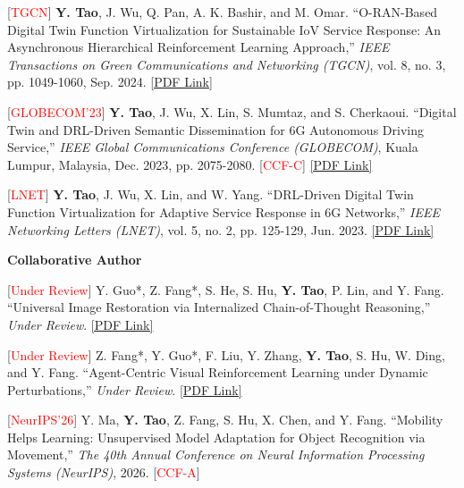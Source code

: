 \documentclass[letterpaper,11pt]{article}
\newcommand{\pdflink}[1]{\href{#1}{[PDF Link]}}
\begin{document}
{{{{{{\begin{justify}
    \normalsize
    [\textcolor{red}{TGCN}] \textbf{Y. Tao}, J. Wu, Q. Pan, A. K. Bashir, and M. Omar. ``O-RAN-Based Digital Twin Function Virtualization for Sustainable IoV Service Response: An Asynchronous Hierarchical Reinforcement Learning Approach,'' \textit{IEEE Transactions on Green Communications and Networking (TGCN)}, vol. 8, no. 3, pp. 1049-1060, Sep. 2024. \pdflink{https://ieeexplore.ieee.org/document/10614333}
\end{justify}

\begin{justify}
    \normalsize
    [\textcolor{red}{GLOBECOM'23}] \textbf{Y. Tao}, J. Wu, X. Lin, S. Mumtaz, and S. Cherkaoui. ``Digital Twin and DRL-Driven Semantic Dissemination for 6G Autonomous Driving Service,'' \textit{IEEE Global Communications Conference (GLOBECOM)}, Kuala Lumpur, Malaysia, Dec. 2023, pp. 2075-2080. [\textcolor{red}{CCF-C}] \pdflink{https://ieeexplore.ieee.org/document/10437455}
\end{justify}

\begin{justify}
    \normalsize
    [\textcolor{red}{LNET}] \textbf{Y. Tao}, J. Wu, X. Lin, and W. Yang. ``DRL-Driven Digital Twin Function Virtualization for Adaptive Service Response in 6G Networks,'' \textit{IEEE Networking Letters (LNET)}, vol. 5, no. 2, pp. 125-129, Jun. 2023. \pdflink{https://ieeexplore.ieee.org/document/10107755}
\end{justify}

\vspace{2mm}
\large\textbf{Collaborative Author}

\begin{justify}
    \normalsize
    [\textcolor{red}{Under Review}] Y. Guo*, Z. Fang*, S. He, S. Hu, \textbf{Y. Tao}, P. Lin, and Y. Fang. ``Universal Image Restoration via Internalized Chain-of-Thought Reasoning,'' \textit{Under Review}. \pdflink{https://arxiv.org/pdf/2606.17557}
\end{justify}

\begin{justify}
    \normalsize
    [\textcolor{red}{Under Review}] Z. Fang*, Y. Guo*, F. Liu, Y. Zhang, \textbf{Y. Tao}, S. Hu, W. Ding, and Y. Fang. ``Agent-Centric Visual Reinforcement Learning under Dynamic Perturbations,'' \textit{Under Review}. \pdflink{https://arxiv.org/pdf/2604.24661}
\end{justify}

\begin{justify}
    \normalsize
    [\textcolor{red}{NeurIPS'26}] Y. Ma, \textbf{Y. Tao}, Z. Fang, S. Hu, X. Chen, and Y. Fang. ``Mobility Helps Learning: Unsupervised Model Adaptation for Object Recognition via Movement,'' \textit{The 40th Annual Conference on Neural Information Processing Systems (NeurIPS)}, 2026. [\textcolor{red}{CCF-A}]
\end{justify}

}}}}}}
\end{document}
